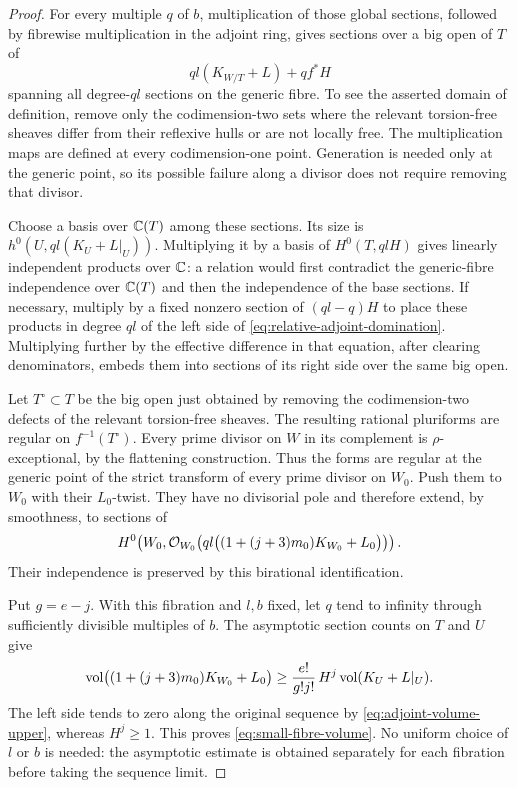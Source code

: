\begin{proof}
For every multiple $q$ of $b$, multiplication of those global
sections, followed by fibrewise multiplication in the adjoint
ring, gives sections over a big open of $T$ of
\[
                        ql(K_{W/T}+L)+qf^*H
\]
spanning all degree-$ql$ sections on the generic fibre.  To see
the asserted domain of definition, remove only the codimension-two
sets where the relevant torsion-free sheaves differ from their
reflexive hulls or are not locally free.  The multiplication maps
are defined at every codimension-one point.  Generation is needed
only at the generic point, so its possible failure along a divisor
does not require removing that divisor.

Choose a basis over $\mathbb C(T)$ among these sections.  Its size is
$h^0(U,ql(K_U+L|_U))$.  Multiplying it by a basis of
$H^0(T,qlH)$ gives linearly independent products over $\mathbb C$:
a relation would first contradict the generic-fibre independence
over $\mathbb C(T)$ and then the independence of the base sections.
If necessary, multiply by a fixed nonzero section of
$(ql-q)H$ to place these products in degree $ql$ of the left side
of \eqref{eq:relative-adjoint-domination}.  Multiplying further by
the effective difference in that equation, after clearing
denominators, embeds them into sections of its right side over
the same big open.

Let $T^\circ\subset T$ be the big open just obtained by removing
the codimension-two defects of the relevant torsion-free sheaves.
The resulting rational pluriforms are regular on $f^{-1}(T^\circ)$.
Every prime divisor on $W$ in its complement is $\rho$-exceptional,
by the flattening construction.  Thus the forms are regular at the
generic point of the strict transform of every prime divisor on
$W_0$.  Push them to $W_0$ with their $L_0$-twist.  They have no
divisorial pole and therefore extend, by smoothness, to sections of
\[
 H^0\!\left(W_0,
 \mathcal O_{W_0}\!\left(ql\bigl((1+(j+3)m_0)K_{W_0}+L_0\bigr)\right)\right).
\]
Their independence is preserved by this birational identification.

Put $g=e-j$.  With this fibration and $l,b$ fixed, let $q$ tend
to infinity through sufficiently divisible multiples of $b$.
The asymptotic section counts on $T$ and $U$ give
\begin{equation}\label{eq:adjoint-volume-lower}
 \operatorname{vol}\bigl((1+(j+3)m_0)K_{W_0}+L_0\bigr)
       \ge \frac{e!}{g!j!}\,H^j\operatorname{vol}(K_U+L|_U).
\end{equation}
The left side tends to zero along the original sequence by
\eqref{eq:adjoint-volume-upper}, whereas $H^j\ge1$.
This proves \eqref{eq:small-fibre-volume}.  No uniform choice of
$l$ or $b$ is needed: the asymptotic estimate is obtained separately
for each fibration before taking the sequence limit.
\end{proof}

